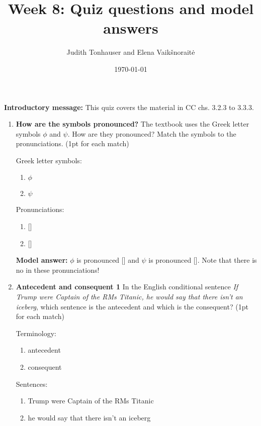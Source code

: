 \documentclass[a4,11pt]{article}
\title{Week 8: Quiz questions and model answers}
\author{Judith Tonhauser and Elena Vaik\v snorait\.{e} }
\date{\today}
\newcommand{\6}{\mbox{$[\hspace*{-.6mm}[$}}
\newcommand{\9}{\mbox{$]\hspace*{-.6mm}]$}}
\begin{document}
\maketitle

{\bf Introductory message:} This quiz covers the material in CC chs. 3.2.3 to 3.3.3.

\begin{enumerate}[leftmargin = 12pt]

\item {\bf How are the symbols pronounced?} The textbook uses the Greek letter symbols $\phi$ and $\psi$. How are they pronounced? Match the symbols to the pronunciations. (1pt for each match)

Greek letter symbols:

\begin{enumerate}
\item $\phi$
\item $\psi$
\end{enumerate}

Pronunciations:

\begin{enumerate}
\item {} []
\item {} []
\end{enumerate}

{\bf Model answer:} $\phi$ is pronounced [] and $\psi$ is pronounced []. Note that there is no  in these pronunciations!

\item {\bf  Antecedent and consequent 1} In the English conditional sentence {\em If Trump were Captain of the RMs Titanic, he would say that there isn't an iceberg}, which sentence is the antecedent and which is the consequent? (1pt for each match)

Terminology:

\begin{enumerate}
\item antecedent
\item consequent
\end{enumerate}

Sentences:

\begin{enumerate}
\item Trump were Captain of the RMs Titanic
\item he would say that there isn't an iceberg
\end{enumerate}


\end{enumerate}
\end{document}
